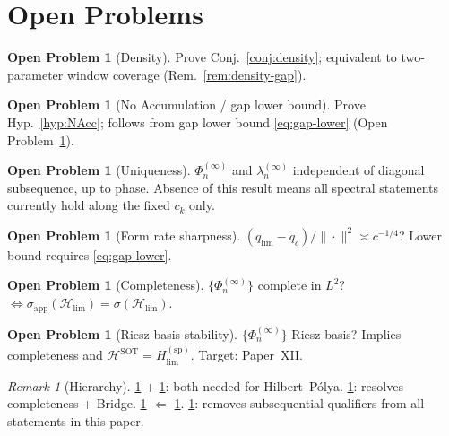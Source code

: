 \documentclass[12pt,a4paper]{amsart}
\theoremstyle{definition}
\newtheorem{problem}[theorem]{Open Problem}
\theoremstyle{remark}
\newtheorem{remark}[theorem]{Remark}
\newcommand{\Hlim}{\mathcal{H}_{\lim}}
\newcommand{\HSOT}{\mathcal{H}^{\mathrm{SOT}}}
\newcommand{\Hspectral}{H_{\lim}^{(\mathrm{sp})}}
\newcommand{\sigapp}{\sigma_{\mathrm{app}}}
\begin{document}
\section{Open Problems}
\label{sec:open-problems}

\begin{problem}[Density]
\label{prob:density}
Prove Conj.~\ref{conj:density};
equivalent to two-parameter window coverage
(Rem.~\ref{rem:density-gap}).
\end{problem}

\begin{problem}[No Accumulation / gap lower bound]
\label{prob:NAcc}
Prove Hyp.~\ref{hyp:NAcc};
follows from gap lower bound \eqref{eq:gap-lower}
(Open Problem~\ref{prob:rate-sharp}).
\end{problem}

\begin{problem}[Uniqueness]
\label{prob:uniqueness}
$\Phi_n^{(\infty)}$ and $\lambda_n^{(\infty)}$
independent of diagonal subsequence,
up to phase. Absence of this result means
all spectral statements currently hold
along the fixed $c_k$ only.
\end{problem}

\begin{problem}[Form rate sharpness]
\label{prob:rate-sharp}
$(q_{\lim}-q_c)/\|{\cdot}\|^2\asymp c^{-1/4}$?
Lower bound requires \eqref{eq:gap-lower}.
\end{problem}

\begin{problem}[Completeness]
\label{prob:completeness}
$\{\Phi_n^{(\infty)}\}$ complete in $L^2$?
$\Leftrightarrow\sigapp(\Hlim)=\sigma(\Hlim)$.
\end{problem}

\begin{problem}[Riesz-basis stability]
\label{prob:riesz}
$\{\Phi_n^{(\infty)}\}$ Riesz basis?
Implies completeness and
$\HSOT=\overline{\Hspectral}$.
Target: Paper~XII.
\end{problem}

\begin{remark}[Hierarchy]
\ref{prob:density} + \ref{prob:completeness}:
both needed for Hilbert--P\'olya.
\ref{prob:riesz}: resolves completeness + Bridge.
\ref{prob:NAcc} $\Leftarrow$ \ref{prob:rate-sharp}.
\ref{prob:uniqueness}: removes subsequential
qualifiers from all statements in this paper.
\end{remark}
\end{document}
